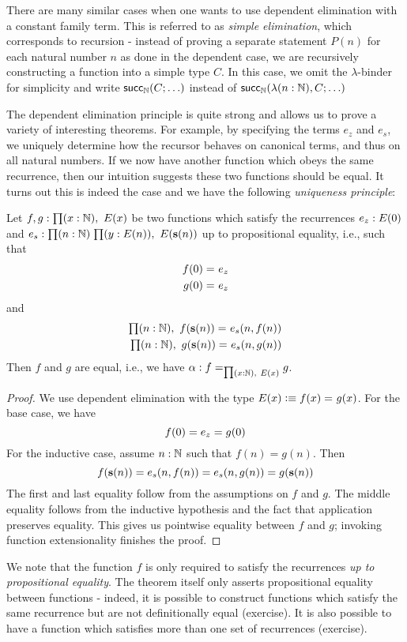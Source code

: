 There are many similar cases when one wants to use dependent elimination with a constant family term. This is referred to as \emph{simple elimination}, which corresponds to recursion - instead of proving a separate statement $P(n)$ for each natural number $n$ as done in the dependent case, we are recursively constructing a function into a simple type $C$. In this case, we omit the $\lambda$-binder for simplicity and write $\mathsf{succ}_\mathbb{N}(C; \ldots)$ instead of $\mathsf{succ}_\mathbb{N}(\lambda (n : \mathbb{N}), C; \ldots)$

The dependent elimination principle is quite strong and allows us to prove a variety of interesting theorems. For example, by specifying the terms $e_z$ and $e_s$, we  uniquely determine how the recursor behaves on canonical terms, and thus on all natural numbers. If we now have another function which obeys the same recurrence, then our intuition suggests these two functions should be equal. It turns out this is indeed the case and we have the following \emph{uniqueness principle}:

\begin{thm}\label{thm:nat-uniq}
Let $f,g : \prd{x:\nat} E(x)$ be two functions which satisfy the recurrences $e_z : E(0)$ and $e_s : \prd{n : \nat}{y : E(n)} E(\s(n))$ up to propositional equality, i.e., such that
\begin{align*}
f(0) =_{} e_z \\ 
g(0) =_{} e_z
\end{align*}
and 
\begin{align*}
\prd{n : \nat} \id{f(\s(n))}{e_s(n, f(n))} \\
\prd{n : \nat} \id{g(\s(n))}{e_s(n, g(n))}
\end{align*}
Then $f$ and $g$ are equal, i.e., we have $\alpha : \id[\prd{x :\nat} E(x)]{f}{g}$. 
\end{thm}

\begin{proof}
We use dependent elimination with the type $E(x) \vcentcolon\equiv f(x) =_{} g(x)$. For the base case, we have \[f(0) = e_z = g(0)\]
For the inductive case, assume $n : \mathbb{N}$ such that $f(n) = g(n)$. Then
\[ f(\mathbf{s}(n)) = e_s(n, f(n)) = e_s(n, g(n)) = g(\mathbf{s}(n)) \]
The first and last equality follow from the assumptions on $f$ and $g$. The middle equality follows from the inductive hypothesis and the fact that application preserves equality. This gives us pointwise equality between $f$ and $g$; invoking function extensionality finishes the proof.
\end{proof}
We note that the function $f$ is only required to satisfy the recurrences \emph{up to propositional equality}. The theorem itself only asserts propositional equality between functions - indeed, it is possible to construct functions which satisfy the same recurrence but are not definitionally equal (exercise). It is also possible to have a function which satisfies more than one set of recurrences (exercise).

